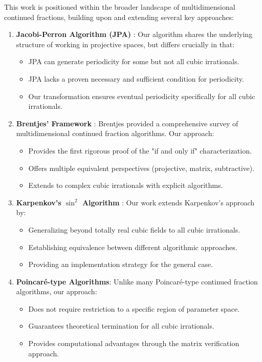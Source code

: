 \begin{response}
This work is positioned within the broader landscape of multidimensional continued fractions, building upon and extending several key approaches:

\begin{enumerate}
\item \textbf{Jacobi-Perron Algorithm (JPA)} \cite{Jacobi1868, Perron1907}: Our \HAPD{} algorithm shares the underlying structure of working in projective spaces, but differs crucially in that:
   \begin{itemize}
   \item JPA can generate periodicity for some but not all cubic irrationals.
   \item JPA lacks a proven necessary and sufficient condition for periodicity.
   \item Our transformation ensures eventual periodicity specifically for all cubic irrationals.
   \end{itemize}

\item \textbf{Brentjes' Framework} \cite{Brentjes1981}: Brentjes provided a comprehensive survey of multidimensional continued fraction algorithms. Our approach:
   \begin{itemize}
   \item Provides the first rigorous proof of the "if and only if" characterization.
   \item Offers multiple equivalent perspectives (projective, matrix, subtractive).
   \item Extends to complex cubic irrationals with explicit algorithms.
   \end{itemize}

\item \textbf{Karpenkov's $\sin^2$ Algorithm} \cite{Karpenkov2019, KarpenkovBook}: Our work extends Karpenkov's approach by:
   \begin{itemize}
   \item Generalizing beyond totally real cubic fields to all cubic irrationals.
   \item Establishing equivalence between different algorithmic approaches.
   \item Providing an implementation strategy for the general case.
   \end{itemize}

\item \textbf{Poincaré-type Algorithms}: Unlike many Poincaré-type continued fraction algorithms, our approach:
   \begin{itemize}
   \item Does not require restriction to a specific region of parameter space.
   \item Guarantees theoretical termination for all cubic irrationals.
   \item Provides computational advantages through the matrix verification approach.
   \end{itemize}
\end{enumerate}


\end{response}
